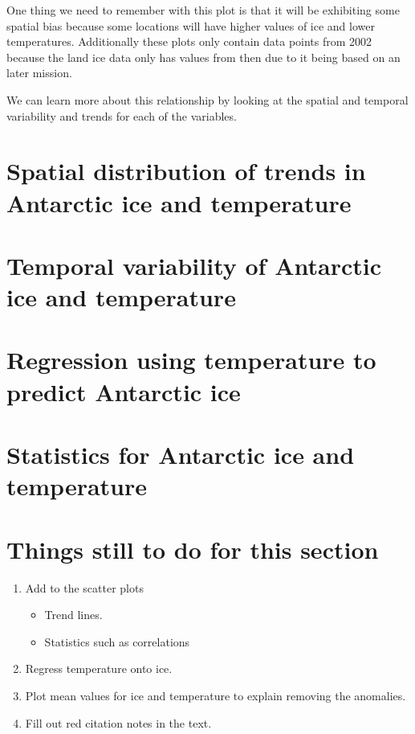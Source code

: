 \documentclass[../main.tex]{subfiles}
\begin{document}
One thing we need to remember with this plot is that it will be exhibiting some spatial bias because some locations will have higher values of ice and lower temperatures. Additionally these plots only contain data points from 2002 because the land ice data only has values from then due to it being based on an later mission. 

We can learn more about this relationship by looking at the spatial and temporal variability and trends for each of the variables.

\section[Spatial distribution of trends]{Spatial distribution of trends in Antarctic ice and temperature}

\section{Temporal variability of Antarctic ice and temperature}

\section{Regression using temperature to predict Antarctic ice}

\section{Statistics for Antarctic ice and temperature}

\section*{Things still to do for this section}
\begin{enumerate}
    \item Add to the scatter plots
    \begin{itemize}
        \item Trend lines.
        \item Statistics such as correlations
    \end{itemize}
    \item Regress temperature onto ice.
    \item Plot mean values for ice and temperature to explain removing the anomalies.
    \item Fill out red citation notes in the text.
\end{enumerate}
\end{document}
